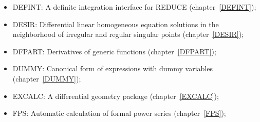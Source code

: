 \begin{itemize}
\item
{DEFINT: A definite integration interface for REDUCE}
(chapter~\ref{DEFINT}); 

\item
{DESIR: Differential linear homogeneous equation solutions in the
neighborhood of irregular and regular singular points}
(chapter~\ref{DESIR});

\item
{DFPART: Derivatives of generic functions}
(chapter~\ref{DFPART}); 

\item
{DUMMY: Canonical form of expressions with dummy variables}
(chapter~\ref{DUMMY}); 

\item
{EXCALC: A differential geometry package} (chapter~\ref{EXCALC});

\item
{FPS: Automatic calculation of formal power series}
(chapter~\ref{FPS}); 


\end{itemize}
